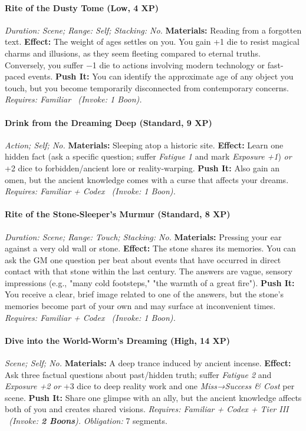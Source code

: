 \documentclass[12pt,twoside]{book}
\begin{document}
\paragraph{Rite of the Dusty Tome (Low, 4 XP)} \emph{Duration: Scene; Range: Self; Stacking: No.}
\textbf{Materials:} Reading from a forgotten text.
\textbf{Effect:} The weight of ages settles on you. You gain +1 die to resist magical charms and illusions, as they seem fleeting compared to eternal truths. Conversely, you suffer −1 die to actions involving modern technology or fast-paced events.
\textbf{Push It:} You can identify the approximate age of any object you touch, but you become temporarily disconnected from contemporary concerns.
\emph{Requires: Familiar \ (\textit{Invoke:} 1 Boon).}
\paragraph{Drink from the Dreaming Deep (Standard, 9 XP)} \emph{Action; Self; No.}
\textbf{Materials:} Sleeping atop a historic site.
\textbf{Effect:} Learn one hidden fact (ask a specific question; suffer \emph{Fatigue 1} and mark \emph{Exposure +1}) \emph{or} +2 dice to forbidden/ancient lore or reality-warping.
\textbf{Push It:} Also gain an omen, but the ancient knowledge comes with a curse that affects your dreams.
\emph{Requires: Familiar + Codex \ (\textit{Invoke:} 1 Boon).}
\paragraph{Rite of the Stone-Sleeper's Murmur (Standard, 8 XP)} \emph{Duration: Scene; Range: Touch; Stacking: No.}
\textbf{Materials:} Pressing your ear against a very old wall or stone.
\textbf{Effect:} The stone shares its memories. You can ask the GM one question per beat about events that have occurred in direct contact with that stone within the last century. The answers are vague, sensory impressions (e.g., "many cold footsteps," "the warmth of a great fire").
\textbf{Push It:} You receive a clear, brief image related to one of the answers, but the stone's memories become part of your own and may surface at inconvenient times.
\emph{Requires: Familiar + Codex \ (\textit{Invoke:} 1 Boon).}
\paragraph{Dive into the World-Worm's Dreaming (High, 14 XP)} \emph{Scene; Self; No.}
\textbf{Materials:} A deep trance induced by ancient incense.
\textbf{Effect:} Ask three factual questions about past/hidden truth; suffer \emph{Fatigue 2} and \emph{Exposure +2} \emph{or} +3 dice to deep reality work and one \emph{Miss→Success \& Cost} per scene.
\textbf{Push It:} Share one glimpse with an ally, but the ancient knowledge affects both of you and creates shared visions.
\emph{Requires: Familiar + Codex + Tier III \ (\textit{Invoke:} \textbf{2 Boons}).}
\emph{Obligation:} 7 segments.
\end{document}
